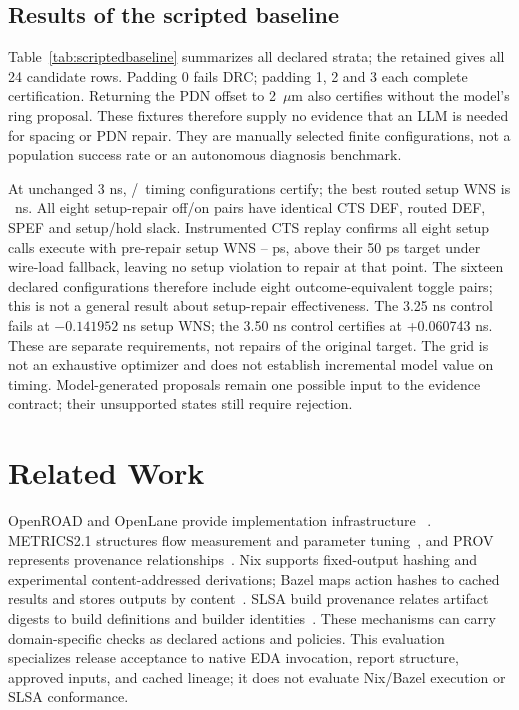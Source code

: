 \documentclass[runningheads]{llncs}
\begin{document}
\subsection{Results of the scripted baseline}
Table~\ref{tab:scriptedbaseline} summarizes all declared strata; the retained
 gives all 24 candidate rows.
Padding 0 fails DRC; padding 1, 2 and 3 each complete certification. Returning
the PDN offset to 2~$\mu$m also certifies without the model's ring proposal.
These fixtures therefore supply no evidence that an LLM is needed for spacing
or PDN repair. They are manually selected finite configurations, not a
population success rate or an autonomous diagnosis benchmark.


At unchanged 3 ns, \ScriptedTimingCertified/\ScriptedTimingStates\ timing
configurations certify; the best routed setup WNS is \ScriptedTimingBest\ ns.
All eight setup-repair off/on pairs have identical CTS DEF, routed DEF, SPEF
and setup/hold slack. Instrumented CTS replay confirms all eight setup calls
execute with pre-repair setup WNS \SetupRepairPreMinPs--\SetupRepairPreMaxPs{} ps,
above their 50 ps target under wire-load fallback, leaving no setup violation
to repair at that point. The sixteen
declared configurations therefore include eight outcome-equivalent toggle
pairs; this is not a general result about setup-repair effectiveness.
The 3.25 ns control fails at $-0.141952$ ns setup WNS; the 3.50 ns control
certifies at +0.060743 ns. These are separate requirements, not repairs of
the original target. The grid is not an exhaustive optimizer and does not establish
incremental model value on timing. Model-generated proposals remain one possible
input to the evidence contract; their unsupported states still require rejection.

\FloatBarrier
\section{Related Work}
OpenROAD and OpenLane provide implementation infrastructure
~\cite{ajayi2019,shalan2020}. METRICS2.1 structures flow measurement and
parameter tuning~\cite{jung2021}, and PROV represents provenance
relationships~\cite{prov2013}. Nix supports fixed-output hashing and
experimental content-addressed derivations; Bazel maps action hashes to
cached results and stores outputs by content~\cite{nixdocs,bazeldocs}.
SLSA build provenance relates artifact digests to build definitions and
builder identities~\cite{slsadocs}. These mechanisms can carry domain-specific
checks as declared actions and policies. This evaluation specializes release
acceptance to native EDA invocation, report structure, approved inputs, and
cached lineage; it does not evaluate Nix/Bazel execution or SLSA conformance.
\end{document}
